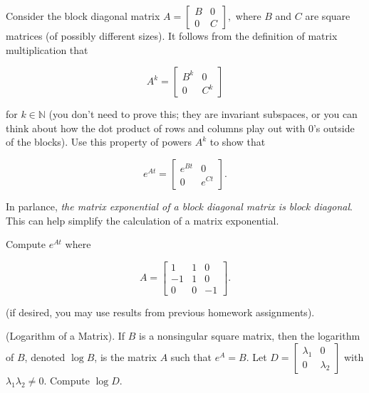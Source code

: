 \documentclass[11pt,letterpaper,boxed]{pset}
\begin{document}
    
    \begin{problem} [Exercise 1.]
        Consider the block diagonal matrix
            $A = \begin{bmatrix} B & 0  \\
            		             0 & C 
                 \end{bmatrix},$
        where $B$ and $C$ are square matrices (of possibly different sizes). It follows from the definition of matrix multiplication that  
         
        \[  A^k = \begin{bmatrix} B^k & 0 \\ 0 & C^k \end{bmatrix}  \]
        
        for $k \in \mathbb{N}$ (you don't need to prove this; they are invariant subspaces, or you can think about how the dot product of rows and columns play out with $0$'s outside of the blocks). Use this property of powers $A^k$ to show that  
        
        \[e^{At} = \begin{bmatrix} e^{B t} & 0 \\ 0 & e^{C t} \end{bmatrix}.\]
        
        In parlance, \textit{the matrix exponential of a block diagonal matrix is block diagonal}. This can help simplify the calculation of a matrix exponential. 
    \end{problem}
    \newpage
    
    \begin{problem} [Exercise 2.]
        Compute $e^{At}$ where
        
        \[  A = \begin{bmatrix} 1 & 1 & 0 \\ -1 & 1 & 0 \\ 0 & 0 & -1 \end{bmatrix}.   \] 
        
        (if desired, you may use results from previous homework assignments). 
    \end{problem}
    \newpage
    
    \begin{problem} [Exercise 3.]
        (Logarithm of a Matrix). If $B$ is a nonsingular square matrix, then the logarithm of $B$, denoted $\log B$,  is the matrix $A$ such that $e^A = B$. Let $D =  \begin{bmatrix} \lambda_1 & 0  \\ 0 & \lambda_2  \end{bmatrix}$ with $\lambda_1 \lambda_2 \neq 0$. Compute $\log D$. 
    \end{problem}
    \newpage
    
\end{document}
